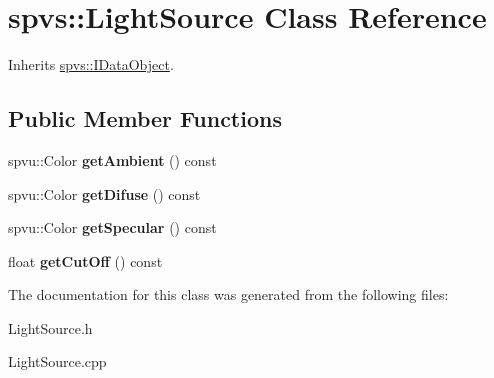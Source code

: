 \hypertarget{classspvs_1_1_light_source}{\section{spvs\-:\-:Light\-Source Class Reference}
\label{classspvs_1_1_light_source}
}


Inherits \hyperlink{classspvs_1_1_i_data_object}{spvs\-::\-I\-Data\-Object}.

\subsection*{Public Member Functions}
\begin{DoxyCompactItemize}
\item 
\hypertarget{classspvs_1_1_light_source_ab04d9d41d384bd5b78cacfdc6eaf245b}{spvu\-::\-Color {\bfseries get\-Ambient} () const }\label{classspvs_1_1_light_source_ab04d9d41d384bd5b78cacfdc6eaf245b}

\item 
\hypertarget{classspvs_1_1_light_source_a0e0eaf01a719f99ed55fb7b227a2ed89}{spvu\-::\-Color {\bfseries get\-Difuse} () const }\label{classspvs_1_1_light_source_a0e0eaf01a719f99ed55fb7b227a2ed89}

\item 
\hypertarget{classspvs_1_1_light_source_a9d3e7dd8d26f00f95eaa510ed475409c}{spvu\-::\-Color {\bfseries get\-Specular} () const }\label{classspvs_1_1_light_source_a9d3e7dd8d26f00f95eaa510ed475409c}

\item 
\hypertarget{classspvs_1_1_light_source_a0fd3dba1e6c608d4a5e1cd420dae6796}{float {\bfseries get\-Cut\-Off} () const }\label{classspvs_1_1_light_source_a0fd3dba1e6c608d4a5e1cd420dae6796}

\end{DoxyCompactItemize}


The documentation for this class was generated from the following files\-:\begin{DoxyCompactItemize}
\item 
Light\-Source.\-h\item 
Light\-Source.\-cpp\end{DoxyCompactItemize}
